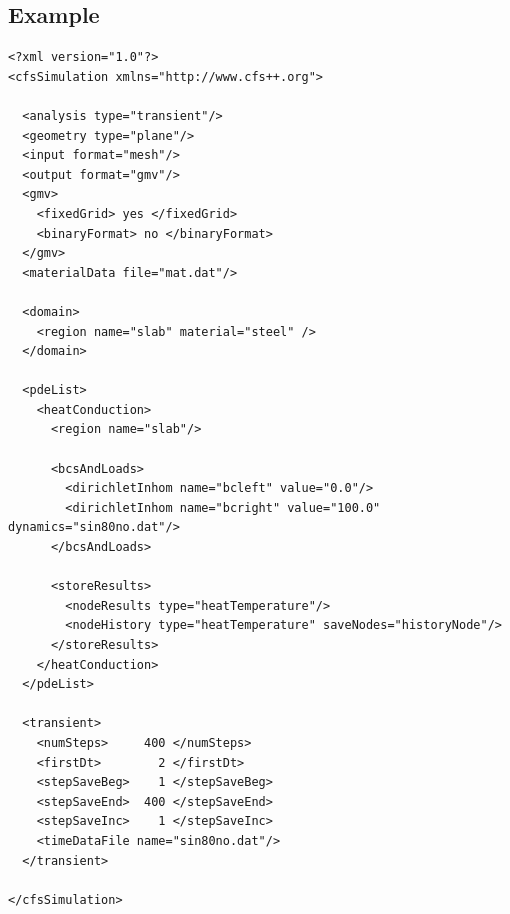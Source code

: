 \subsection{Example}

{\footnotesize
\begin{verbatim}
<?xml version="1.0"?>
<cfsSimulation xmlns="http://www.cfs++.org">

  <analysis type="transient"/>
  <geometry type="plane"/>
  <input format="mesh"/>
  <output format="gmv"/>
  <gmv>
    <fixedGrid> yes </fixedGrid>
    <binaryFormat> no </binaryFormat>
  </gmv>
  <materialData file="mat.dat"/>

  <domain>
    <region name="slab" material="steel" />
  </domain>

  <pdeList>
    <heatConduction>
      <region name="slab"/>

      <bcsAndLoads>
        <dirichletInhom name="bcleft" value="0.0"/>
        <dirichletInhom name="bcright" value="100.0" dynamics="sin80no.dat"/>
      </bcsAndLoads>

      <storeResults>
        <nodeResults type="heatTemperature"/>
        <nodeHistory type="heatTemperature" saveNodes="historyNode"/>
      </storeResults>
    </heatConduction>
  </pdeList> 

  <transient>
    <numSteps>     400 </numSteps>
    <firstDt>        2 </firstDt>
    <stepSaveBeg>    1 </stepSaveBeg>
    <stepSaveEnd>  400 </stepSaveEnd>
    <stepSaveInc>    1 </stepSaveInc>
    <timeDataFile name="sin80no.dat"/>
  </transient>

</cfsSimulation>
\end{verbatim}
}
